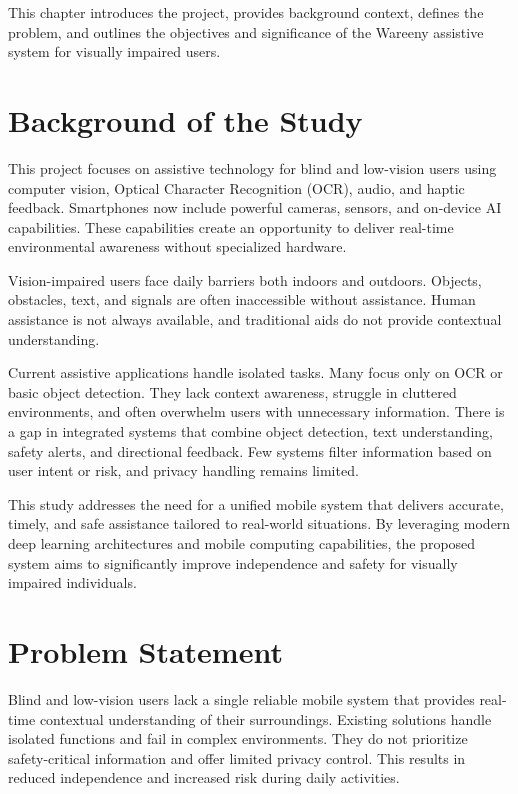 \documentclass[a4paper]{report}
\begin{document}
This chapter introduces the project, provides background context, defines the problem, and outlines the objectives and significance of the Wareeny assistive system for visually impaired users.

\section{Background of the Study}

This project focuses on assistive technology for blind and low-vision users using computer vision, Optical Character Recognition (OCR), audio, and haptic feedback. Smartphones now include powerful cameras, sensors, and on-device AI capabilities. These capabilities create an opportunity to deliver real-time environmental awareness without specialized hardware.

Vision-impaired users face daily barriers both indoors and outdoors. Objects, obstacles, text, and signals are often inaccessible without assistance. Human assistance is not always available, and traditional aids do not provide contextual understanding.

Current assistive applications handle isolated tasks. Many focus only on OCR or basic object detection. They lack context awareness, struggle in cluttered environments, and often overwhelm users with unnecessary information. There is a gap in integrated systems that combine object detection, text understanding, safety alerts, and directional feedback. Few systems filter information based on user intent or risk, and privacy handling remains limited.

This study addresses the need for a unified mobile system that delivers accurate, timely, and safe assistance tailored to real-world situations. By leveraging modern deep learning architectures and mobile computing capabilities, the proposed system aims to significantly improve independence and safety for visually impaired individuals.

\section{Problem Statement}

Blind and low-vision users lack a single reliable mobile system that provides real-time contextual understanding of their surroundings. Existing solutions handle isolated functions and fail in complex environments. They do not prioritize safety-critical information and offer limited privacy control. This results in reduced independence and increased risk during daily activities.
\end{document}

